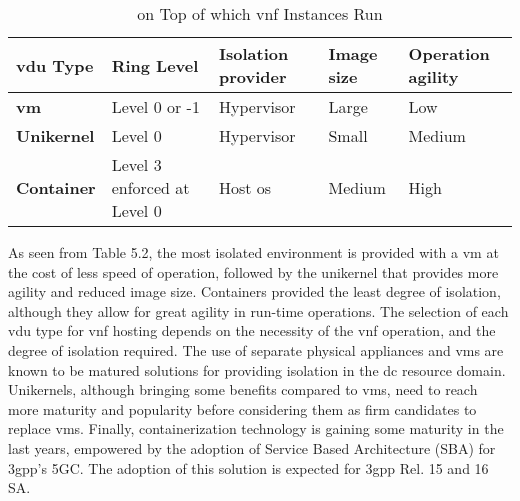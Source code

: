 \begin{enumerate}
        \begin{table}[!ht]
           \begin{threeparttable}
        \caption[Comparison Between Types of \acrshort{vdu}s]{on Top of which \acrshort{vnf} Instances Run}
        \label{tab:vdus}
        \setlength\tabcolsep{1pt} %
        
        \begin{tabular*}{\columnwidth}{@{\extracolsep{\fill}} lllll}
        \toprule
             \acrshort{vdu} Type &Ring Level &Isolation provider &Image size &Operation agility \\
        \midrule
              \textbf{\acrshort{vm}} &Level 0 or -1 &Hypervisor &Large &Low \\
        \addlinespace
             \textbf{Unikernel} &Level 0 &Hypervisor & Small & Medium \\
        \addlinespace
              \textbf{Container} &Level 3 enforced at Level 0 &Host \acrshort{os} &Medium &High\\
        \bottomrule
        \end{tabular*}
        
        \smallskip
        \scriptsize
           \end{threeparttable}
        \end{table}
        
        As seen from Table 5.2, the most isolated environment is provided with a \acrshort{vm} at the cost of less speed of operation, followed by the unikernel that provides more agility and reduced image size. Containers provided the least degree of isolation, although they allow for great agility in run-time operations. The selection of each \acrshort{vdu} type for \acrshort{vnf} hosting depends on the necessity of the \acrshort{vnf} operation, and the degree of isolation required. The use of separate physical appliances and \acrshort{vm}s are known to be matured solutions for providing isolation in the \acrshort{dc} resource domain. Unikernels, although bringing some benefits compared to \acrshort{vm}s, need to reach more maturity and popularity before considering them as firm candidates to replace \acrshort{vm}s. Finally, containerization technology is gaining some maturity in the last years, empowered by the adoption of Service Based Architecture (SBA) for \acrshort{3gpp}’s 5GC. The adoption of this solution is expected for \acrshort{3gpp} Rel. 15 and 16 SA.


\end{enumerate}
